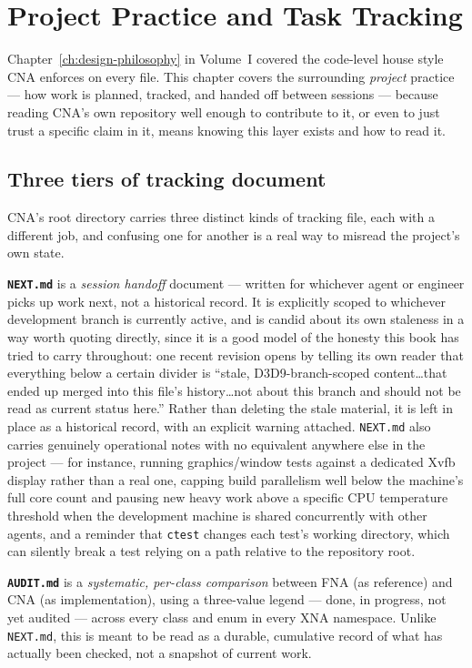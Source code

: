 \chapter{Project Practice and Task Tracking}
\label{ch:project-practice}

Chapter~\ref{ch:design-philosophy} in Volume~I covered the code-level house style CNA
enforces on every file. This chapter covers the surrounding \emph{project} practice --- how
work is planned, tracked, and handed off between sessions --- because reading CNA's own
repository well enough to contribute to it, or even to just trust a specific claim in it,
means knowing this layer exists and how to read it.

\section{Three tiers of tracking document}

CNA's root directory carries three distinct kinds of tracking file, each with a different job,
and confusing one for another is a real way to misread the project's own state.

\textbf{\texttt{NEXT.md}} is a \emph{session handoff} document --- written for whichever
agent or engineer picks up work next, not a historical record. It is explicitly scoped to
whichever development branch is currently active, and is candid about its own staleness in a
way worth quoting directly, since it is a good model of the honesty this book has tried to
carry throughout: one recent revision opens by telling its own reader that everything below a
certain divider is ``stale, D3D9-branch-scoped content\ldots that ended up merged into this
file's history\ldots not about this branch and should not be read as current status here.''
Rather than deleting the stale material, it is left in place as a historical record, with an
explicit warning attached. \texttt{NEXT.md} also carries genuinely operational notes with no
equivalent anywhere else in the project --- for instance, running graphics/window tests
against a dedicated Xvfb display rather than a real one, capping build parallelism well below
the machine's full core count and pausing new heavy work above a specific CPU temperature
threshold when the development machine is shared concurrently with other agents, and a
reminder that \texttt{ctest} changes each test's working directory, which can silently break a
test relying on a path relative to the repository root.

\textbf{\texttt{AUDIT.md}} is a \emph{systematic, per-class comparison} between FNA (as
reference) and CNA (as implementation), using a three-value legend --- done, in progress, not
yet audited --- across every class and enum in every XNA namespace. Unlike \texttt{NEXT.md},
this is meant to be read as a durable, cumulative record of what has actually been checked,
not a snapshot of current work.

